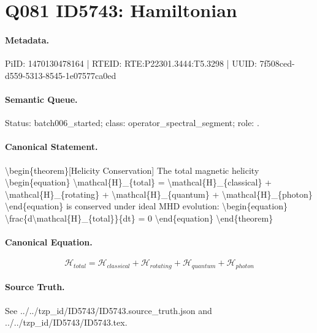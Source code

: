 \section*{Q081 ID5743: Hamiltonian}
\paragraph{Metadata.}
PiID: 1470130478164 | RTEID: RTE:P22301.3444:T5.3298 | UUID: 7f508ced-d559-5313-8545-1e07577ca0ed

\paragraph{Semantic Queue.}
Status: batch006\_started; class: operator\_spectral\_segment; role: .

\paragraph{Canonical Statement.}
\textbackslash{}begin\{theorem\}[Helicity Conservation] The total magnetic helicity \textbackslash{}begin\{equation\} \textbackslash{}mathcal\{H\}\_\{total\} = \textbackslash{}mathcal\{H\}\_\{classical\} + \textbackslash{}mathcal\{H\}\_\{rotating\} + \textbackslash{}mathcal\{H\}\_\{quantum\} + \textbackslash{}mathcal\{H\}\_\{photon\} \textbackslash{}end\{equation\} is conserved under ideal MHD evolution: \textbackslash{}begin\{equation\} \textbackslash{}frac\{d\textbackslash{}mathcal\{H\}\_\{total\}\}\{dt\} = 0 \textbackslash{}end\{equation\} \textbackslash{}end\{theorem\}

\paragraph{Canonical Equation.}
\[
\begin{equation} \mathcal{H}_{total} = \mathcal{H}_{classical} + \mathcal{H}_{rotating} + \mathcal{H}_{quantum} + \mathcal{H}_{photon} \end{equation}
\]

\paragraph{Source Truth.}
See ../../tzp\_id/ID5743/ID5743.source\_truth.json and ../../tzp\_id/ID5743/ID5743.tex.
